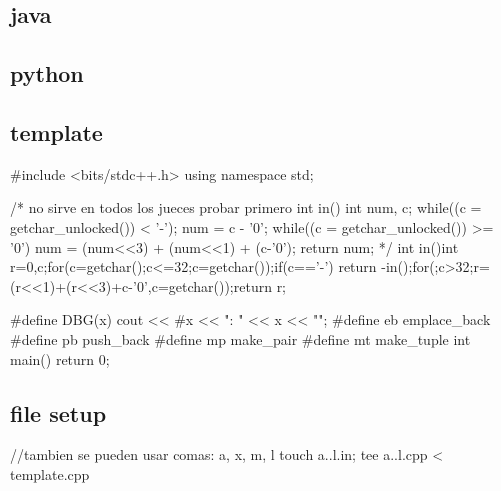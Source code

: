 \subsection{java}
\subsection{python}
\subsection{template}
\begin{code}
#include <bits/stdc++.h>
using namespace std;

/* no sirve en todos los jueces probar primero
int in() {
    int num, c;
    while((c = getchar_unlocked()) < '-');
    num = c - '0';
    while((c = getchar_unlocked()) >= '0') {
        num = (num<<3) + (num<<1) + (c-'0');
    }
    return num;
}
*/
int in(){int r=0,c;for(c=getchar();c<=32;c=getchar());if(c=='-') return -in();for(;c>32;r=(r<<1)+(r<<3)+c-'0',c=getchar());return r;}

#define DBG(x) cout << #x << ": " << x << "\n";
#define eb emplace_back
#define pb push_back
#define mp make_pair
#define mt make_tuple
int main(){
	return 0;
}
\end{code}
\subsection{file setup}
\begin{code}
//tambien se pueden usar comas: {a, x, m, l}
touch {a..l}.in; tee {a..l}.cpp < template.cpp
\end{code}


